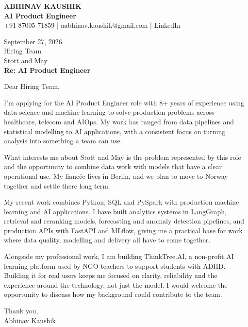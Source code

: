 \documentclass[10pt,a4paper]{article}
\begin{document}
\begin{center}
{\Large\bfseries ABHINAV KAUSHIK}\\[2pt]
{\bfseries AI Product Engineer}\\[2pt]
+91 87005 71859 \quad | \quad aabhinav.kaushik@gmail.com \quad | \quad LinkedIn
\end{center}
\vspace{8pt}
September 27, 2026\\[6pt]
Hiring Team\\
Stott and May\\[4pt]
\textbf{Re: AI Product Engineer}

Dear Hiring Team,

I’m applying for the AI Product Engineer role with 8+ years of experience using data science and machine learning to solve production problems across healthcare, telecom and AIOps. My work has ranged from data pipelines and statistical modelling to AI applications, with a consistent focus on turning analysis into something a team can use.

What interests me about Stott and May is the problem represented by this role and the opportunity to combine data work with models that have a clear operational use. My fiancée lives in Berlin, and we plan to move to Norway together and settle there long term.

My recent work combines Python, SQL and PySpark with production machine learning and AI applications. I have built analytics systems in LangGraph, retrieval and reranking models, forecasting and anomaly detection pipelines, and production APIs with FastAPI and MLflow, giving me a practical base for work where data quality, modelling and delivery all have to come together.

Alongside my professional work, I am building ThinkTree.AI, a non-profit AI learning platform used by NGO teachers to support students with ADHD. Building it for real users keeps me focused on clarity, reliability and the experience around the technology, not just the model. I would welcome the opportunity to discuss how my background could contribute to the team.

Thank you,\\
Abhinav Kaushik
\end{document}
